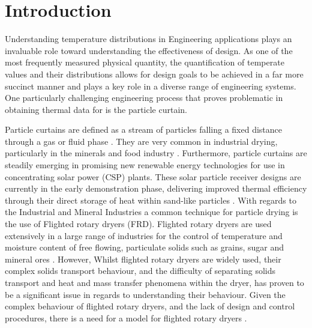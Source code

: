 \documentclass[12pt]{article}
\newcommand{\ts}{\textsuperscript}
\newcommand{\pe}{\vspace{0.3cm}}
\newcommand{\mycite}[1]{\ts{\cite{#1}}}
\begin{document}
\section{Introduction}

Understanding temperature distributions in Engineering applications plays an invaluable role toward understanding the effectiveness of design. 
As one of the most frequently measured physical quantity, the quantification of temperate values and their distributions allows for design goals to be achieved in a far more succinct manner and plays a key role in a diverse range of engineering systems. One particularly challenging engineering process that proves problematic in obtaining thermal data for is the particle curtain. \\

\pe 


Particle curtains are defined as a stream of particles falling a fixed distance through a gas or fluid phase \mycite{AfsharCurtainPhd}. They are very common in industrial drying, particularly in the minerals and food industry \mycite{AfsharCurtainPhd}. Furthermore, particle curtains are steadily emerging in promising new renewable energy technologies for use in concentrating solar power (CSP) plants. These solar particle receiver designs are currently in the early demonstration phase, delivering improved thermal efficiency through their direct storage of heat within sand-like particles \ts{\cite{christian2015system, viebahn2011potential}}. With regards to the Industrial and Mineral Industries a common technique for particle drying is the use of Flighted rotary dryers (FRD). Flighted rotary dryers are used extensively in a large range of industries for the control of
temperature and moisture content of free flowing, particulate solids such as grains,
sugar and mineral ores \mycite{AndrewLeePhd}. However, Whilst flighted rotary dryers are widely used, their complex solids transport behaviour, and the difficulty of separating solids transport and heat and mass transfer
phenomena within the dryer, has proven to be a significant issue in regards to understanding their behaviour. Given the complex behaviour of flighted rotary dryers, and the lack of design and control procedures, there is a need for a model for flighted rotary dryers \mycite{AndrewLeePhd}. \\ 
\end{document}
